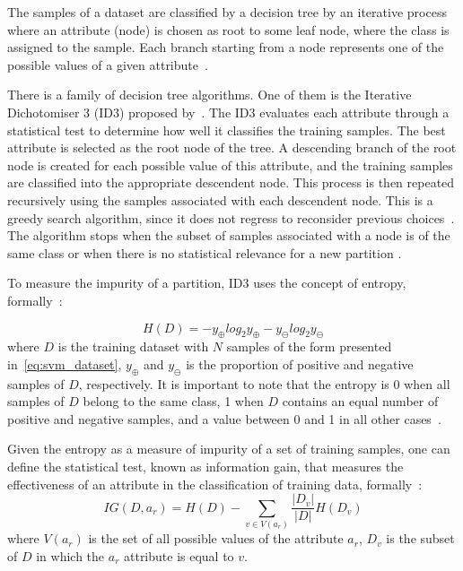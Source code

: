 The samples of a dataset are classified by a decision tree by an iterative process where an attribute (node) is chosen as root to some leaf node, where the class is assigned to the sample. Each branch starting from a node represents one of the possible values of a given attribute~\citep{mitchell:97}.

There is a family of decision tree algorithms. One of them is the Iterative Dichotomiser 3 (ID3) proposed by~\citet{quinlan:86}. The ID3 evaluates each attribute through a statistical test to determine how well it classifies the training samples. The best attribute is selected as the root node of the tree. A descending branch of the root node is created for each possible value of this attribute, and the training samples are classified into the appropriate descendent node. This process is then repeated recursively using the samples associated with each descendent node. This is a greedy search algorithm, since it does not regress to reconsider previous choices~\citep{mitchell:97}. The algorithm stops when the subset of samples associated with a node is of the same class or when there is no statistical relevance for a new partition \citep{quinlan:86}.

To measure the impurity of a partition, ID3 uses the concept of entropy, formally~\citep{quinlan:86}:

\begin{equation}
\label{eq:arvore_devisao_entropia}
H(D) = - y_\oplus log_2 y_\oplus - y_\ominus log_2 y_\ominus
\end{equation}
\noindent where $D$ is the training dataset with $N$ samples of the form presented in~\ref{eq:svm_dataset}, $y_\oplus$ and $y_\ominus$ is the proportion of positive and negative samples of $D$, respectively. It is important to note that the entropy is 0 when all samples of $D$ belong to the same class, 1 when $D$ contains an equal number of positive and negative samples, and a value between 0 and 1 in all other cases~\citep{mitchell:97}.

Given the entropy as a measure of impurity of a set of training samples, one can define the statistical test, known as information gain, that measures the effectiveness of an attribute in the classification of training data, formally~\citep{quinlan:86}:
\begin{equation}
\label{eq:dt_information_gain}
IG(D, a_r) = H(D) - \sum_{v \in V(a_r)} \frac{|D_v|}{|D|} H(D_v)
\end{equation}
\noindent where $V(a_r)$ is the set of all possible values of the attribute $a_r$, $D_v$ is the subset of $D$ in which the $a_r$ attribute is equal to $v$.

